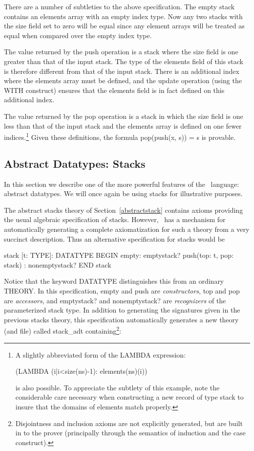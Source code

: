 There are a number of subtleties to the above specification.  The {\stt
empty} stack contains an {\stt elements} array with an empty index type.
Now any two stacks with the {\stt size} field set to zero will be equal
since any element arrays will be treated as equal when compared over
the empty index type.

The value returned by the {\stt push} operation is a stack where the size
field is one greater than that of the input stack.  The type of the {\stt
elements} field of this stack is therefore different from that of the
input stack.  There is an additional index where the {\stt elements}
array must be defined, and the update operation (using the {\stt WITH}
construct) ensures that the {\stt elements} field is in fact defined on
this additional index.

The value returned by the {\stt pop} operation is a stack in which
the size field is one less than that of the input stack and the
{\stt elements} array is defined on one fewer indices.\footnote
{A slightly abbreviated form of the {\stt LAMBDA} expression:
\begin{pvsex} (LAMBDA (i|i<size(ns)-1): elements(ns)(i)) \end{pvsex}
is also possible.  To appreciate the subtlety of this example, note
the considerable care necessary when constructing a new record of type
{\stt stack} to insure that the domains of {\stt elements} match
properly.}  Given these definitions, the formula {\stt pop(push(x, s)) = s}
is provable.

\subsection{Abstract Datatypes: Stacks}
\label{datatypes}

In this section we describe one of the more powerful features of the
\pvs\ language: abstract datatypes.  We will once again be using stacks
for illustrative purposes.

The abstract {\stt stacks} theory of Section~\ref{abstractstack} contains
axioms providing the
usual algebraic specification of stacks.  However, \pvs\ has a mechanism
for automatically generating a complete axiomatization for such a theory
from a very succinct
description.  Thus an alternative specification for stacks would be
\begin{pvsex}
  stack [t: TYPE]: DATATYPE
   BEGIN
    empty: emptystack?
    push(top: t, pop: stack) : nonemptystack?
   END stack
\end{pvsex}
Notice that the keyword {\stt DATATYPE} distinguishes this from an
ordinary {\stt THEORY}.
In this specification, {\stt empty} and {\stt push} are {\em
constructors\/}, {\stt top} and {\stt pop} are {\em accessors\/}, and {\stt
emptystack?} and {\stt nonemptystack?} are {\em recognizers\/} of the
parameterized {\stt stack} type.  In addition to generating the
signatures given in the previous {\stt stacks} theory, this specification
automatically generates a new theory (and file) called {\stt stack\_adt}
containing\footnote{Disjointness and inclusion axioms are not explicitly
generated, but are built in to the prover (principally through the semantics
of induction and the case construct).}:

